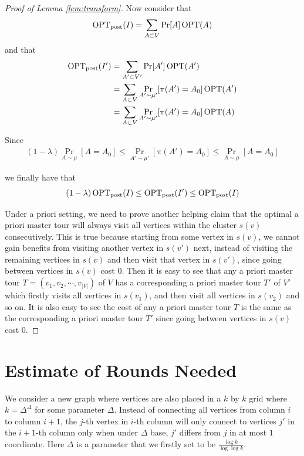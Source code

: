 \documentclass[12pt]{amsart}
\begin{document}
\begin{proof}[Proof of Lemma \ref{lem:transform}]
    Now consider that 
    $$
        \operatorname{OPT}_\mathrm{post}(I) = \sum_{A \subset V} \Pr[A]\operatorname{OPT}(A)
    $$ and that 
    \begin{align*}
        \operatorname{OPT}_\mathrm{post}(I') &= \sum_{A' \subset  V'} \Pr[A']\operatorname{OPT}(A') \\
        &= \sum_{A \subset V} \Pr_{A' \sim \mu'}[\pi(A')=A_0]\operatorname{OPT}(A') \\
        &= \sum_{A \subset V} \Pr_{A' \sim \mu'}[\pi(A')=A_0]\operatorname{OPT}(A)
    \end{align*}

    Since 
    \begin{align*}
       (1-\lambda)\Pr_{A \sim \mu}[A = A_0] \le\Pr_{A' \sim \mu'}[\pi(A') = A_0] \le \Pr_{A \sim \mu}[A = A_0]
    \end{align*}

    we finally have that
    $$
        (1-\lambda)\operatorname{OPT}_\mathrm{post}(I) \le \operatorname{OPT}_\mathrm{post}(I')  \le \operatorname{OPT}_\mathrm{post}(I) 
    $$  

    Under a priori setting, we need to prove another helping claim that the optimal a priori master tour will always visit all vertices within the cluster $s(v)$ consecutively. This is true because starting from some vertex in $s(v)$, we cannot gain benefits from visiting another vertex in $s(v')$ next, instead of visiting the remaining vertices in $s(v)$ and then visit that vertex in $s(v')$, since going between vertices in $s(v)$ cost $0$. Then it is easy to see that any a priori master tour $T = (v_1, v_2, \cdots, v_{|V|})$ of $V$ has a corresponding a priori master tour $T'$ of $V'$ which firstly visits all vertices in $s(v_1)$, and then visit all vertices in $s(v_2)$ and so on. It is also easy to see the cost of any a priori master tour $T$ is the same as the corresponding  a priori master tour $T'$ since going between vertices in $s(v)$ cost $0$.
    
\end{proof}

\section{Estimate of Rounds Needed}\label{sec:gridexample}

We consider a new graph where vertices are also placed in a $k$ by $k$ grid where $k = \Delta^\Delta$ for some parameter $\Delta$. Instead of connecting all vertices from column $i$ to column $i + 1$, the $j$-th vertex in $i$-th column will only connect to vertices $j'$ in the $i+1$-th column only when under $\Delta$ base, $j'$ differs from  $j$  in at most $1$ coordinate. Here $\Delta$ is a parameter that we firstly set to be $\frac{\log k}{\log \log k}$.
\end{document}
